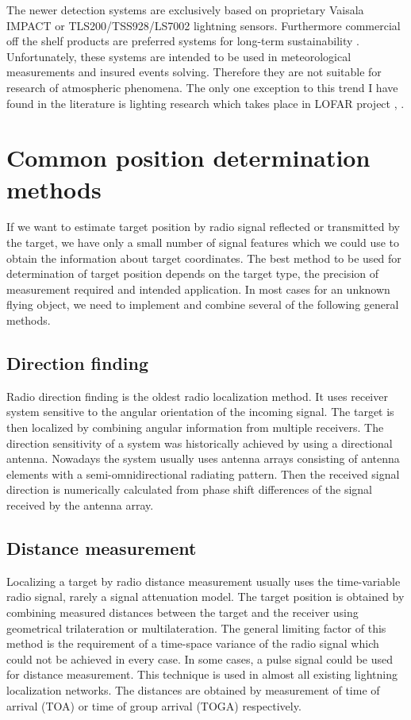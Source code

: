 \documentclass[twoside]{ctuthesis}
\theoremstyle{plain}
\theoremstyle{definition}
\theoremstyle{note}
\begin{document}
The newer detection systems are exclusively based on proprietary Vaisala  IMPACT \cite{IMPACT_sensor} or TLS200/TSS928/LS7002 lightning sensors. 
Furthermore commercial off the shelf products are preferred systems for long-term sustainability \cite{4DLSS}. Unfortunately, these systems are intended to be used in meteorological measurements and insured events solving. Therefore they are not suitable for research of atmospheric phenomena. The only one exception to this trend I have found in the literature is lighting research which takes place in LOFAR project \cite{LOFAR_lightning}, \cite{LOFAR_lightning2}.  

\section{Common position determination methods}

If we want to estimate target position by radio signal reflected or transmitted by the target, we have only a small number of signal features which we could use to obtain the information about target coordinates. The best method to be used for determination of target position depends on the target type, the precision of measurement required and intended application. In most cases for an unknown flying object, we need to implement and combine several of the following general methods. 

\subsection{Direction finding}

Radio direction finding is the oldest radio localization method.  It uses receiver system sensitive to the angular orientation of the incoming signal.  The target is then localized by combining angular information from multiple receivers.  The direction sensitivity of a system was historically achieved by using a directional antenna. Nowadays the system usually uses antenna arrays consisting of antenna elements with a semi-omnidirectional radiating pattern. Then the received signal direction is numerically calculated from phase shift differences of the signal received by the antenna array. 

\subsection{Distance measurement}
Localizing a target by radio distance measurement usually uses the time-variable radio signal, rarely a signal attenuation model.  The target position is obtained by combining measured distances between the target and the receiver using geometrical trilateration or multilateration. The general limiting factor of this method is the requirement of a time-space variance of the radio signal which could not be achieved in every case. 
In some cases, a pulse signal could be used for distance measurement. This technique is used in almost all existing lightning localization networks. The distances are obtained by measurement of time of arrival (TOA) or time of group arrival (TOGA) respectively.
\end{document}

